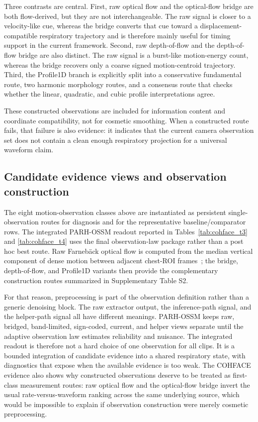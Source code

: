 \documentclass[fleqn,10pt]{wlscirep}
\begin{document}
Three contrasts are central. First, raw optical flow and the optical-flow
bridge are both flow-derived, but they are not interchangeable. The raw signal
is closer to a velocity-like cue, whereas the bridge converts that cue toward a
displacement-compatible respiratory trajectory and is therefore mainly useful
for timing support in the current framework. Second, raw depth-of-flow and the
depth-of-flow bridge are also distinct. The raw signal is a burst-like
motion-energy count, whereas the bridge recovers only a coarse signed
motion-centroid trajectory. Third, the Profile1D branch is explicitly split
into a conservative fundamental route, two harmonic morphology routes, and a
consensus route that checks whether the linear, quadratic, and cubic profile
interpretations agree.
\FloatBarrier

These constructed observations are included for information content and
coordinate compatibility, not for cosmetic smoothing. When a constructed route
fails, that failure is also evidence: it indicates that the current camera
observation set does not contain a clean enough respiratory projection for a
universal waveform claim.

\subsection*{Candidate evidence views and observation construction}
The eight motion-observation classes above are instantiated as persistent
single-observation routes for diagnosis and for the representative
baseline/comparator rows. The integrated PARH-OSSM readout reported in
Tables~\ref{tab:cohface_t3} and \ref{tab:cohface_t4} uses the final
observation-law package rather than a post hoc best route. Raw
Farneb\"ack optical flow is computed from the median vertical component of dense
motion between adjacent chest-ROI frames~\cite{Farneback2003}; the bridge,
depth-of-flow, and Profile1D variants then provide the complementary
construction routes summarized in Supplementary Table S2.

For that reason, preprocessing is part of the observation definition rather
than a generic denoising block. The raw extractor output, the inference-path
signal, and the helper-path signal all have different meanings. PARH-OSSM
keeps raw, bridged, band-limited, sign-coded, current, and helper views
separate until the adaptive observation law estimates reliability and nuisance.
The integrated readout is therefore not a hard choice of one observation for
all clips. It is a bounded integration of candidate evidence into a shared
respiratory state, with diagnostics that expose when the available evidence is
too weak. The COHFACE evidence also shows why constructed observations deserve
to be treated as first-class measurement routes: raw optical flow and the
optical-flow bridge invert the usual rate-versus-waveform ranking across the
same underlying source, which would be impossible to explain if observation
construction were merely cosmetic preprocessing.
\end{document}
